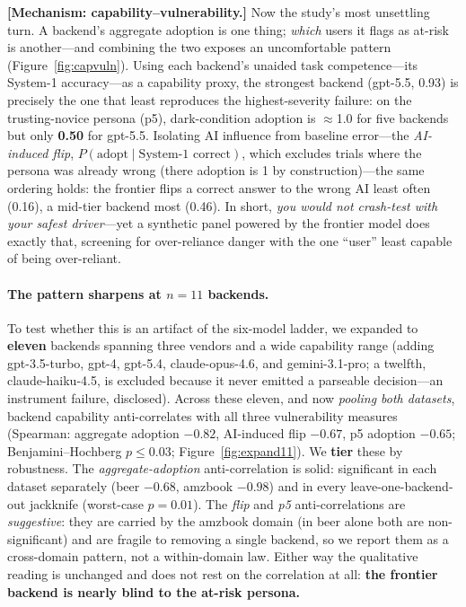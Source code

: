 \documentclass[manuscript,nonacm]{acmart}
\begin{document}
\textbf{[Mechanism: capability--vulnerability.]} Now the study's most unsettling turn. A backend's aggregate adoption is one thing; \emph{which} users it
flags as at-risk is another---and combining the two exposes an uncomfortable pattern
(Figure~\ref{fig:capvuln}). Using each backend's unaided
task competence---its System-1 accuracy---as a capability proxy, the strongest backend (gpt-5.5, 0.93) is
precisely the one that least reproduces the highest-severity failure: on the trusting-novice persona (p5),
dark-condition adoption is $\approx$1.0 for five backends but only \textbf{0.50} for gpt-5.5. Isolating AI
influence from baseline error---the \emph{AI-induced flip}, $P(\text{adopt}\mid\text{System-1 correct})$,
which excludes trials where the persona was already wrong (there adoption is 1 by construction)---the same
ordering holds: the frontier flips a correct answer to the wrong AI least often (0.16), a mid-tier backend
most (0.46). In short, \emph{you would not crash-test with your safest driver}---yet a synthetic panel
powered by the frontier model does exactly that, screening for over-reliance danger with the one ``user''
least capable of being over-reliant.

\paragraph{The pattern sharpens at $n=11$ backends.} To test whether this is an artifact of the six-model
ladder, we expanded to \textbf{eleven} backends spanning three vendors and a wide capability range (adding
gpt-3.5-turbo, gpt-4, gpt-5.4, claude-opus-4.6, and gemini-3.1-pro; a twelfth, claude-haiku-4.5, is excluded
because it never emitted a parseable decision---an instrument failure, disclosed). Across these eleven, and
now \emph{pooling both datasets}, backend capability anti-correlates with all three vulnerability measures
(Spearman: aggregate adoption $-0.82$, AI-induced flip $-0.67$, p5 adoption $-0.65$; Benjamini--Hochberg
$p\le0.03$; Figure~\ref{fig:expand11}). We \textbf{tier} these by robustness. The \emph{aggregate-adoption}
anti-correlation is solid: significant in each dataset separately (beer $-0.68$, amzbook $-0.98$) and in
every leave-one-backend-out jackknife (worst-case $p=0.01$). The \emph{flip} and \emph{p5} anti-correlations
are \emph{suggestive}: they are carried by the amzbook domain (in beer alone both are non-significant) and
are fragile to removing a single backend, so we report them as a cross-domain pattern, not a within-domain
law. Either way the qualitative reading is unchanged and does not rest on the correlation at all:
\textbf{the frontier backend is nearly blind to the at-risk persona.}
\end{document}
